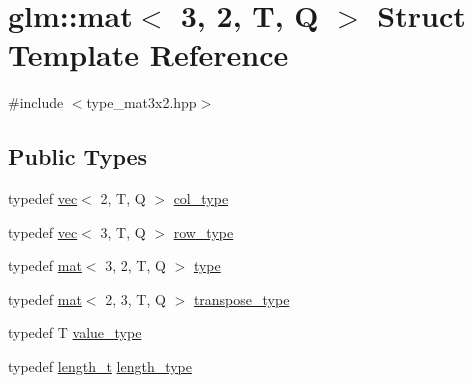 \hypertarget{structglm_1_1mat_3_013_00_012_00_01_t_00_01_q_01_4}{}\section{glm\+:\+:mat$<$ 3, 2, T, Q $>$ Struct Template Reference}
\label{structglm_1_1mat_3_013_00_012_00_01_t_00_01_q_01_4}


{\ttfamily \#include $<$type\+\_\+mat3x2.\+hpp$>$}

\subsection*{Public Types}
\begin{DoxyCompactItemize}
\item 
typedef \hyperlink{structglm_1_1vec}{vec}$<$ 2, T, Q $>$ \hyperlink{structglm_1_1mat_3_013_00_012_00_01_t_00_01_q_01_4_aa610dcaaae528e1eea8bdaaa435ad3a4}{col\+\_\+type}
\item 
typedef \hyperlink{structglm_1_1vec}{vec}$<$ 3, T, Q $>$ \hyperlink{structglm_1_1mat_3_013_00_012_00_01_t_00_01_q_01_4_a0b91ceeaafce26ca1b6b64f8ea34dbb1}{row\+\_\+type}
\item 
typedef \hyperlink{structglm_1_1mat}{mat}$<$ 3, 2, T, Q $>$ \hyperlink{structglm_1_1mat_3_013_00_012_00_01_t_00_01_q_01_4_acc76b4ad182b342b586dce28e0da8e16}{type}
\item 
typedef \hyperlink{structglm_1_1mat}{mat}$<$ 2, 3, T, Q $>$ \hyperlink{structglm_1_1mat_3_013_00_012_00_01_t_00_01_q_01_4_ab5fe2bf92b71a51cd33be87c6c9ef7d1}{transpose\+\_\+type}
\item 
typedef T \hyperlink{structglm_1_1mat_3_013_00_012_00_01_t_00_01_q_01_4_ae1e6e1cc8ff07c13ae805cabd6cefd77}{value\+\_\+type}
\item 
typedef \hyperlink{namespaceglm_a090a0de2260835bee80e71a702492ed9}{length\+\_\+t} \hyperlink{structglm_1_1mat_3_013_00_012_00_01_t_00_01_q_01_4_ac2f268fa5e899b2a6ad8139183ed61d4}{length\+\_\+type}
\end{DoxyCompactItemize}
